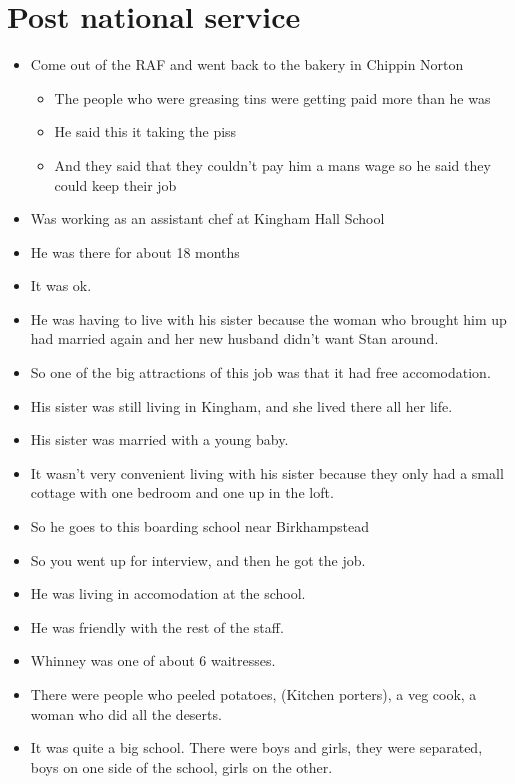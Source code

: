 \documentclass[10pt,twocolumn,letterpaper]{article}
\begin{document}
\section{Post national service}
\begin{itemize}
    \item Come out of the RAF and went back to the bakery in Chippin Norton
    \begin{itemize}
        \item The people who were greasing tins were getting paid more than he was
        \item He said this it taking the piss
        \item And they said that they couldn't pay him a mans wage so he said they could keep their job
    \end{itemize}
    \item Was working as an assistant chef at Kingham Hall School
    \item He was there for about 18 months
    \item It was ok.
    \item He was having to live with his sister because the woman who brought him up had married again and her new husband didn't want Stan around.
    \item So one of the big attractions of this job was that it had free accomodation.
    \item His sister was still living in Kingham, and she lived there all her life.
    \item His sister was married with a young baby.
    \item It wasn't very convenient living with his sister because they only had a small cottage with one bedroom and one up in the loft.
    \item So he goes to this boarding school near Birkhampstead
    \item So you went up for interview, and then he got the job. 
    \item He was living in accomodation at the school.
    \item He was friendly with the rest of the staff.
    \item Whinney was one of about 6 waitresses.
    \item There were people who peeled potatoes, (Kitchen porters), a veg cook, a woman who did all the deserts.
    \item It was quite a big school. There were boys and girls, they were separated, boys on one side of the school, girls on the other. 

\end{itemize}
\end{document}
